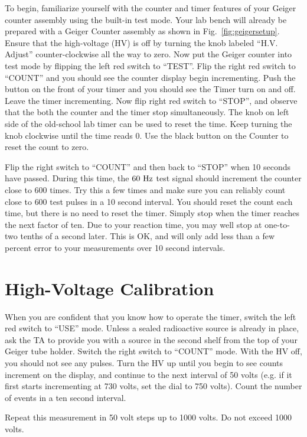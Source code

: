 To begin, familiarize yourself with the counter and timer features of
your Geiger counter assembly using the built-in test mode.  Your lab
bench will already be prepared with a Geiger Counter assembly as shown
in Fig.~\ref{fig:geigersetup}.  Ensure that the high-voltage (HV) is
off by turning the knob labeled ``H.V. Adjust'' counter-clockwise all
the way to zero.  Now put the Geiger counter into test mode by
flipping the left red switch to ``TEST''.  Flip the right red switch
to ``COUNT'' and you should see the counter display begin
incrementing.  Push the button on the front of your timer and you
should see the Timer turn on and off.  Leave the timer incrementing.
Now flip right red switch to ``STOP'', and observe that the both the
counter and the timer stop simultaneously.  The knob on left side of
the old-school lab timer can be used to reset the time.  Keep turning
the knob clockwise until the time reads 0.  Use the black button on
the Counter to reset the count to zero.

Flip the right switch to ``COUNT'' and then back to ``STOP'' when 10
seconds have passed.  During this time, the $60~\rm Hz$ test signal
should increment the counter close to 600 times.  Try this a few times
and make sure you can reliably count close to $600$ test pulses in a
10 second interval.  You should reset the count each time, but there
is no need to reset the timer.  Simply stop when the timer reaches the
next factor of ten.  Due to your reaction time, you may well stop at
one-to-two tenths of a second later.  This is OK, and will only add
less than a few percent error to your measurements over 10 second
intervals.

\section{High-Voltage Calibration}

When you are confident that you know how to operate the timer, switch
the left red switch to ``USE'' mode.  Unless a sealed radioactive
source is already in place, ask the TA to provide you with a source in
the second shelf from the top of your Geiger tube holder.  Switch the
right switch to ``COUNT'' mode.  With the HV off, you should not see
any pulses.  Turn the HV up until you begin to see counts increment on
the display, and continue to the next interval of 50 volts (e.g. if it
first starts incrementing at 730 volts, set the dial to 750 volts).
Count the number of events in a ten second interval.

Repeat this measurement in 50 volt steps up to 1000 volts.  Do not exceed 1000 volts.


